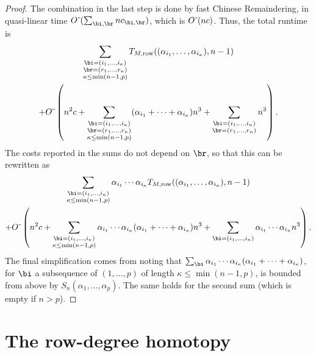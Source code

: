 \documentclass[12pt]{article}
\begin{document}
\begin{proof}
  The combination in the last step is done by fast Chinese Remaindering,
  in quasi-linear time $\softO(\sum_{\bi,\br} n c_{\bi,\br})$,
  which is ${O}{\,\tilde{ }\,}(n c)$. Thus, the total runtime is 
  \begin{multline*}
 \sum_{\substack{\bi=(i_1,\dots,i_\kappa)\\ \br=(r_1,\dots,r_\kappa)\\\kappa\le\min(n-1,p)}}
T_{M,{\rm row}}((\alpha_{i_1},\dots,\alpha_{i_\kappa}), n-1)\\
+\softO\left (n^2 c + \sum_{\substack{\bi=(i_1,\dots,i_\kappa)\\ \br=(r_1,\dots,r_\kappa)\\\kappa\le\min(n-1,p)}}
  (\alpha_{i_1} + \cdots +\alpha_{i_\kappa}) n^3 
  +  \sum_{\substack{\bi=(i_1,\dots,i_n)\\ \br=(r_1,\dots,r_n)}} n^3\right).    
  \end{multline*}
  The costs reported in the sums do not depend on $\br$, so that 
  this can be rewritten as 
  \begin{multline*}
 \sum_{\substack{\bi=(i_1,\dots,i_\kappa)\\ \kappa\le\min(n-1,p)}}
  \alpha_{i_1}  \cdots \alpha_{i_\kappa}T_{M,{\rm row}}((\alpha_{i_1},\dots,\alpha_{i_\kappa}), n-1)\\
+\softO\left (n^2 c + \sum_{\substack{\bi=(i_1,\dots,i_\kappa)\\ \kappa\le\min(n-1,p)}}
    \alpha_{i_1}  \cdots \alpha_{i_\kappa} (\alpha_{i_1} + \cdots +\alpha_{i_\kappa}) n^3 
  +  \sum_{\substack{\bi=(i_1,\dots,i_n)}   }\alpha_{i_1}  \cdots \alpha_{i_n} n^3\right).    
  \end{multline*}
  The final simplification comes from noting that $\sum_{\bi}
  \alpha_{i_1} \cdots \alpha_{i_\kappa}(\alpha_{i_1} + \cdots
  +\alpha_{i_\kappa})$, for $\bi$ a subsequence of $(1,\dots,p)$ of
  length $\kappa\le\min(n-1,p)$, is bounded from above by
  $S_n(\alpha_1,\dots,\alpha_p)$. The same holds for the second
  sum (which is empty if $n >p$).
\end{proof}





\section{The row-degree homotopy}\label{sec:rowdegree}
\end{document}
